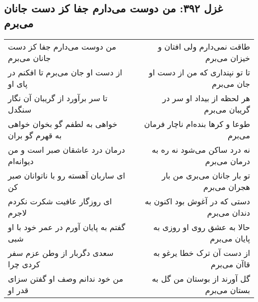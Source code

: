 \begin{center}
\section*{غزل ۳۹۲: من دوست می‌دارم جفا کز دست جانان می‌برم}
\label{sec:392}
\begin{longtable}{l p{0.5cm} r}
من دوست می‌دارم جفا کز دست جانان می‌برم
&&
طاقت نمی‌دارم ولی افتان و خیزان می‌برم
\\
از دست او جان می‌برم تا افکنم در پای او
&&
تا تو نپنداری که من از دست او جان می‌برم
\\
تا سر برآورد از گریبان آن نگار سنگدل
&&
هر لحظه از بیداد او سر در گریبان می‌برم
\\
خواهی به لطفم گو بخوان خواهی به قهرم گو بران
&&
طوعا و کرها بنده‌ام ناچار فرمان می‌برم
\\
درمان درد عاشقان صبر است و من دیوانه‌ام
&&
نه درد ساکن می‌شود نه ره به درمان می‌برم
\\
ای ساربان آهسته رو با ناتوانان صبر کن
&&
تو بار جانان می‌بری من بار هجران می‌برم
\\
ای روزگار عافیت شکرت نکردم لاجرم
&&
دستی که در آغوش بود اکنون به دندان می‌برم
\\
گفتم به پایان آورم در عمر خود با او شبی
&&
حالا به عشق روی او روزی به پایان می‌برم
\\
سعدی دگربار از وطن عزم سفر کردی چرا
&&
از دست آن ترک خطا یرغو به قاآن می‌برم
\\
من خود ندانم وصف او گفتن سزای قدر او
&&
گل آورند از بوستان من گل به بستان می‌برم
\\
\end{longtable}
\end{center}
